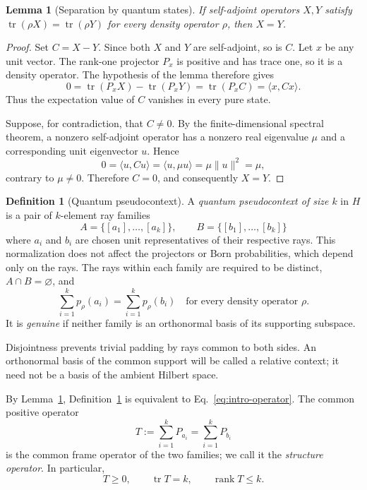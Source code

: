 \documentclass[
  twocolumn,
  aps,
  pra,
  floatfix,
  amsmath,amssymb,
  longbibliography
]{revtex4-2}
\newtheorem{lemma}[theorem]{Lemma}
\theoremstyle{definition}
\newtheorem{definition}[theorem]{Definition}
\theoremstyle{remark}
\newcommand{\Tr}{\operatorname{tr}}
\newcommand{\1}{\mathbf 1}
\begin{document}
\begin{lemma}[Separation by quantum states]
\label{lem:separation}
If self-adjoint operators $X,Y$ satisfy
$\Tr(\rho X)=\Tr(\rho Y)$ for every density operator $\rho$, then $X=Y$.
\end{lemma}

\begin{proof}
Set $C=X-Y$.  Since both $X$ and $Y$ are self-adjoint, so is $C$.  Let $x$
be any unit vector.  The rank-one projector $P_x$ is positive and has trace
one, so it is a density operator.  The hypothesis of the lemma therefore
gives
\[
 0=\Tr(P_xX)-\Tr(P_xY)=\Tr(P_xC)=\langle x,Cx\rangle.
\]
Thus the expectation value of $C$ vanishes in every pure state.

Suppose, for contradiction, that $C\ne0$.  By the finite-dimensional
spectral theorem, a nonzero self-adjoint operator has a nonzero real
eigenvalue $\mu$ and a corresponding unit eigenvector $u$.  Hence
\[
 0=\langle u,Cu\rangle
  =\langle u,\mu u\rangle
  =\mu\|u\|^2
  =\mu,
\]
contrary to $\mu\ne0$.  Therefore $C=0$, and consequently $X=Y$.
\end{proof}

\begin{definition}[Quantum pseudocontext]
\label{def:quantum-pseudocontext}
A \emph{quantum pseudocontext of size $k$} in $H$ is a pair of $k$-element
ray families
\[
 A=\{[a_1],\ldots,[a_k]\},\qquad
 B=\{[b_1],\ldots,[b_k]\}
\]
where $a_i$ and $b_i$ are chosen unit representatives of their respective
rays.  This normalization does not affect the projectors or Born
probabilities, which depend only on the rays.  The rays within each family
are required to be distinct, $A\cap B=\varnothing$, and
\begin{equation}
 \sum_{i=1}^{k}p_\rho(a_i)=\sum_{i=1}^{k}p_\rho(b_i)
 \quad\text{for every density operator }\rho.
 \label{eq:def-probability}
\end{equation}
It is \emph{genuine} if neither family is an orthonormal basis of its
supporting subspace.
\end{definition}

Disjointness prevents trivial padding by rays common to both sides.  An
orthonormal basis of the common support will be called a relative context; it
need not be a basis of the ambient Hilbert space.

By Lemma~\ref{lem:separation}, Definition~\ref{def:quantum-pseudocontext} is
equivalent to Eq.~\eqref{eq:intro-operator}.  The common positive operator
\begin{equation}
 T:=\sum_{i=1}^{k}P_{a_i}=\sum_{i=1}^{k}P_{b_i}
 \label{eq:structure}
\end{equation}
is the common frame operator of the two families; we call it the
\emph{structure operator}.  In particular,
\begin{equation}
 T\ge0,\qquad \Tr T=k,\qquad \operatorname{rank}T\le k.
 \label{eq:basic-T}
\end{equation}
\end{document}
